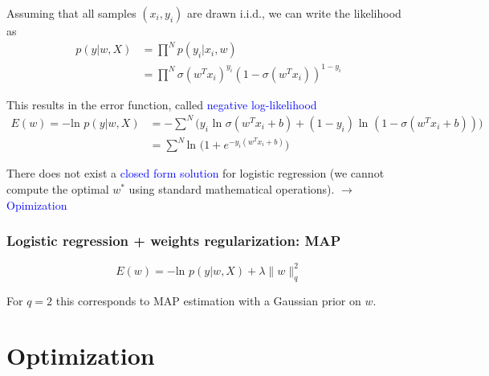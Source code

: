 \documentclass[a4paper,10pt,twoside=true,DIV=10,headsepline,plainheadsepline]{scrartcl}
\begin{document}
			Assuming that all samples $(x_i , y_i )$ are drawn i.i.d., we can write the
likelihood as
			\begin{align}
				p(y | w,X) &= \prod^N p(y_i | x_i, w) \\
				&= \prod^N \sigma (w^T x_i)^{y_i} (1 - \sigma (w^T x_i))^{1 - y_i}
			\end{align}

		This results in the error function, called \textcolor{blue}{negative log-likelihood}
			\begin{align}
				E(w) = - \textrm{ln } p(y | w,X) &= - \sum^N \big( y_i \textrm{ ln } \sigma (w^T x_i + b) + (1 - y_i) \textrm{ ln } (1 - \sigma (w^T x_i + b)) \big)\\
				    &= \sum^N \textrm{ln } \big(1 + e^{- y_i (w^T x_i + b)}\big)
			\end{align}

		There does not exist a \textcolor{blue}{closed form solution} for logistic regression (we cannot compute the optimal $w^*$ using standard mathematical operations). $\rightarrow$ \textcolor{blue}{Opimization}

		\subsubsection{Logistic regression + weights regularization: MAP}
			\begin{equation}
				E(w) = - \textrm{ln } p(y | w,X) + \lambda \| w \|^2_q
			\end{equation}

		For $q = 2$ this corresponds to MAP estimation with a Gaussian prior on $w$.

		

	\section{Optimization}
		
\end{document}
